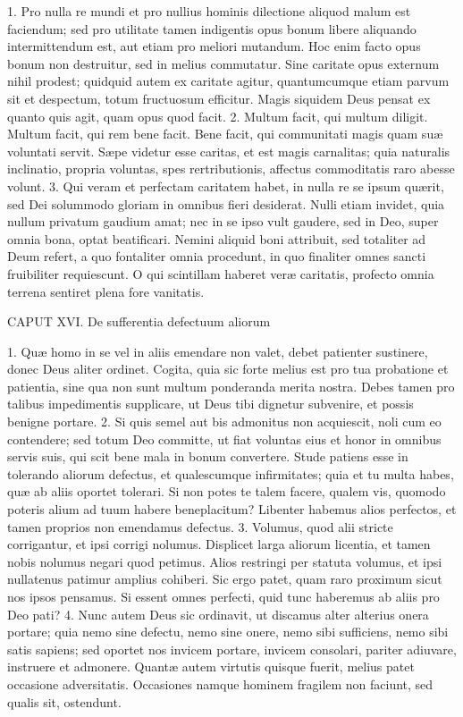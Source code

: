 \documentclass[twoside]{article}
\begin{document}
1. Pro nulla re mundi et pro nullius hominis dilectione aliquod malum est faciendum; sed pro utilitate tamen indigentis opus bonum libere aliquando intermittendum est, aut etiam pro meliori mutandum. Hoc enim facto opus bonum non destruitur, sed in melius commutatur. Sine caritate opus externum nihil prodest; quidquid autem ex caritate agitur, quantumcumque etiam parvum sit et despectum, totum fructuosum efficitur. Magis siquidem Deus pensat ex quanto quis agit, quam opus quod facit.
2. Multum facit, qui multum diligit. Multum facit, qui rem bene facit. Bene facit, qui communitati magis quam suæ voluntati servit. Sæpe videtur esse caritas, et est magis carnalitas; quia naturalis inclinatio, propria voluntas, spes rertributionis, affectus commoditatis raro abesse volunt.
3. Qui veram et perfectam caritatem habet, in nulla re se ipsum quærit, sed Dei solummodo gloriam in omnibus fieri desiderat. Nulli etiam invidet, quia nullum privatum gaudium amat; nec in se ipso vult gaudere, sed in Deo, super omnia bona, optat beatificari. Nemini aliquid boni attribuit, sed totaliter ad Deum refert, a quo fontaliter omnia procedunt, in quo finaliter omnes sancti fruibiliter requiescunt. O qui scintillam haberet veræ caritatis, profecto omnia terrena sentiret plena fore vanitatis.


CAPUT XVI.
De sufferentia defectuum aliorum

1. Quæ homo in se vel in aliis emendare non valet, debet patienter sustinere, donec Deus aliter ordinet. Cogita, quia sic forte melius est pro tua probatione et patientia, sine qua non sunt multum ponderanda merita nostra. Debes tamen pro talibus impedimentis supplicare, ut Deus tibi dignetur subvenire, et possis benigne portare.
2. Si quis semel aut bis admonitus non acquiescit, noli cum eo contendere; sed totum Deo committe, ut fiat voluntas eius et honor in omnibus servis suis, qui scit bene mala in bonum convertere. Stude patiens esse in tolerando aliorum defectus, et qualescumque infirmitates; quia et tu multa habes, quæ ab aliis oportet tolerari. Si non potes te talem facere, qualem vis, quomodo poteris alium ad tuum habere beneplacitum? Libenter habemus alios perfectos, et tamen proprios non emendamus defectus.
3. Volumus, quod alii stricte corrigantur, et ipsi corrigi nolumus. Displicet larga aliorum licentia, et tamen nobis nolumus negari quod petimus. Alios restringi per statuta volumus, et ipsi nullatenus patimur amplius cohiberi. Sic ergo patet, quam raro proximum sicut nos ipsos pensamus. Si essent omnes perfecti, quid tunc haberemus ab aliis pro Deo pati?
4. Nunc autem Deus sic ordinavit, ut discamus alter alterius onera portare; quia nemo sine defectu, nemo sine onere, nemo sibi sufficiens, nemo sibi satis sapiens; sed oportet nos invicem portare, invicem consolari, pariter adiuvare, instruere et admonere. Quantæ autem virtutis quisque fuerit, melius patet occasione adversitatis. Occasiones namque hominem fragilem non faciunt, sed qualis sit, ostendunt.
\end{document}
